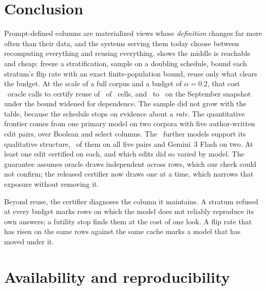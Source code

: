 \keepheading
\section{Conclusion}
\label{sec:conclusion}

Prompt-defined columns are materialized views whose \emph{definition}
changes far more often than their data, and the systems serving them
today choose between recomputing everything and reusing everything.
\sivm{} shows the middle is reachable and cheap: freeze a
stratification, sample on a doubling schedule, bound each stratum's flip
rate with an exact finite-population bound, reuse only what clears the
budget. At the scale of a full corpus and a budget of $\alpha{=}0.2$,
that cost \deployOracle\ oracle calls to certify reuse of
\deployReused\ of \deployN\ cells, and \widenSepLooseCallsEst\ to
\widenSepLooseCallsHi\ on the September snapshot under the bound widened
for dependence. The sample did not
grow with the table, because the schedule stops on evidence about a
\emph{rate}. The
quantitative frontier comes from one primary model on two corpora with
five author-written edit pairs, over Boolean and select columns. The
\famCountWord\ further models support its qualitative structure,
\famFivePairFamiliesWord\ of them on all five pairs and Gemini~3 Flash
on two. At least one edit certified on each, and which edits did so varied
by model. The guarantee assumes oracle draws independent across rows,
which our check could not confirm; the released certifier now draws one
at a time, which narrows that exposure without removing it.

Beyond reuse, the certifier diagnoses the column it maintains. A
stratum refused at every budget marks rows on which the model does not
reliably reproduce its own answers; a futility stop finds them at the
cost of one look. A flip rate that has risen on the same rows against the
same cache marks a model that has moved under it.

\keepheading
\section*{Availability and reproducibility}
\keeprunin
